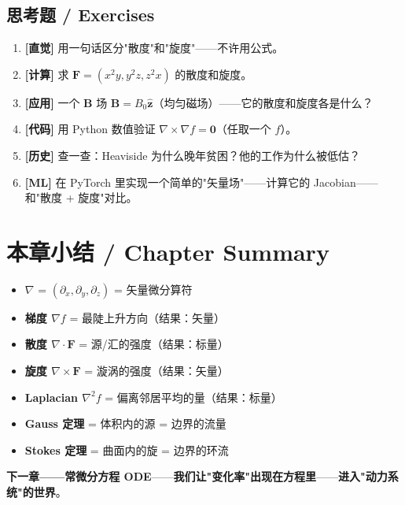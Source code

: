 \subsection{思考题 / Exercises}

\begin{enumerate}
\item \textbf{[直觉]} 用一句话区分"散度"和"旋度"——不许用公式。
\item \textbf{[计算]} 求 $\bm{F} = (x^2 y, y^2 z, z^2 x)$ 的散度和旋度。
\item \textbf{[应用]} 一个 $\bm{B}$ 场 $\bm{B} = B_0 \hat{\bm{z}}$（均匀磁场）——它的散度和旋度各是什么？
\item \textbf{[代码]} 用 Python 数值验证 $\nabla \times \nabla f = \bm{0}$（任取一个 $f$）。
\item \textbf{[历史]} 查一查：Heaviside 为什么晚年贫困？他的工作为什么被低估？
\item \textbf{[ML]} 在 PyTorch 里实现一个简单的"矢量场"——计算它的 Jacobian——和"散度 + 旋度"对比。
\end{enumerate}

\section{本章小结 / Chapter Summary}

\begin{tcolorbox}[essbox={本章核心}]
\begin{itemize}
\item \textbf{$\nabla$} = $(\partial_x, \partial_y, \partial_z)$ = 矢量微分算符
\item \textbf{梯度 $\nabla f$} = 最陡上升方向（结果：矢量）
\item \textbf{散度 $\nabla \cdot \bm{F}$} = 源/汇的强度（结果：标量）
\item \textbf{旋度 $\nabla \times \bm{F}$} = 漩涡的强度（结果：矢量）
\item \textbf{Laplacian $\nabla^2 f$} = 偏离邻居平均的量（结果：标量）
\item \textbf{Gauss 定理} = 体积内的源 = 边界的流量
\item \textbf{Stokes 定理} = 曲面内的旋 = 边界的环流
\end{itemize}
\end{tcolorbox}

\textbf{下一章——常微分方程 ODE}——\textbf{我们让"变化率"出现在方程里}——\textbf{进入"动力系统"的世界}。

\clearpage
